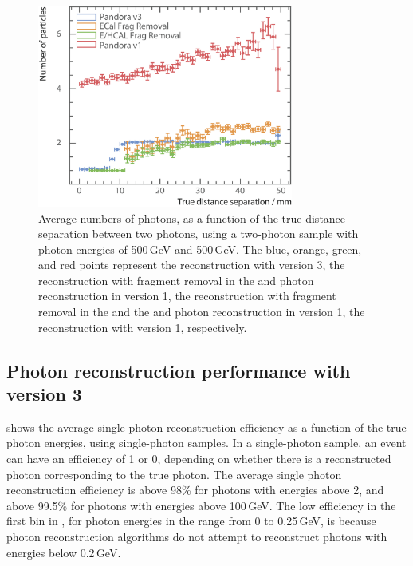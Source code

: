 \begin{figure}[tbph]
\centering
\includegraphics[width=0.75\textwidth]{photon/DoubleCompareAlg4}
\caption[Average number of photons, as a function of the MC distance separation for different algorithms combinations.]
{Average numbers of photons, as a function of the true distance separation between two photons, using a two-photon sample with photon energies of  500\,GeV and 500\,GeV. The blue, orange, green, and red points represent the reconstruction with \pandora version 3, the reconstruction with fragment removal in the \ECAL and photon reconstruction in  \pandora version 1,  the reconstruction with fragment removal in the \ECAL and the \HCAL and photon reconstruction in  \pandora version 1, the reconstruction with \pandora version 1, respectively.}
\label{fig:photonDoubleCompareAlgs}
\end{figure}

\subsection{Photon reconstruction performance with \pandora version 3}


 shows the average single photon reconstruction  efficiency as a function of the true photon energies, using single-photon samples.  In a single-photon sample, an event can have an efficiency of 1 or 0, depending on whether there is a reconstructed photon  corresponding to the true photon. The average single photon reconstruction efficiency is above 98\% for photons with energies above 2\GeV, and above 99.5\% for photons  with energies  above 100\,GeV.  The low efficiency in the first bin in , for photon energies in the range from 0 to 0.25\,GeV, is because photon reconstruction algorithms do not attempt to reconstruct photons with energies below 0.2\,GeV.


